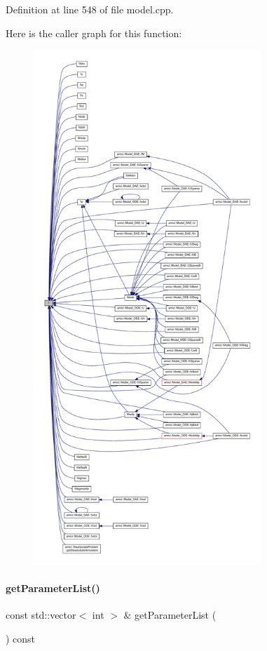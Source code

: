 Definition at line 548 of file model.\+cpp.

Here is the caller graph for this function\+:
\nopagebreak
\begin{figure}[H]
\begin{center}
\leavevmode
\includegraphics[height=550pt]{classamici_1_1_model_a711281d57e9710226face29151cc4641_icgraph}
\end{center}
\end{figure}
\mbox{\label{classamici_1_1_model_a94b6dfdb4883c916627b287e4d7b9b44}} 
\paragraph{\texorpdfstring{get\+Parameter\+List()}{getParameterList()}}
{\footnotesize\ttfamily const std\+::vector$<$ int $>$ \& get\+Parameter\+List (\begin{DoxyParamCaption}{ }\end{DoxyParamCaption}) const}

